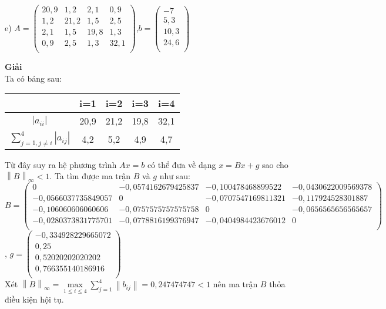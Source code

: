 e) $A= \begin{pmatrix}
20,9&1,2&2,1&0,9\\
1,2&21,2&1,5&2,5\\
2,1&1,5&19,8&1,3\\
0,9&2,5&1,3&32,1\\
\end{pmatrix}$,$b= \begin{pmatrix}
-7\\
5,3\\
10,3\\
24,6\\
\end{pmatrix}$
\par
\textbf{Giải}\\
Ta có bảng sau:\\
\begin{center}
\begin{tabular}{|c|c|c|c|c|}\hline
&i=1&i=2&i=3&i=4\\ \hline
$\left|a_{ii} \right|$&20,9&21,2&19,8&32,1\\ \hline
$\sum\limits_{j=1, j\neq i}^{4} \left|a_{ij}\right|$&4,2&5,2&4,9&4,7\\ \hline
\end{tabular}
\end{center}
Từ đây suy ra hệ phương trình $Ax=b$ có thể đưa về dạng $x=Bx+g$ sao cho $\left\|B\right\|_{\infty} <1$.
Ta tìm được ma trận $B$ và $g$ như sau:\\
$B=\begin{pmatrix}
0&-0,0574162679425837&-0,100478468899522&-0,0430622009569378\\
-0,0566037735849057&0&-0,0707547169811321&-0,117924528301887\\
-0,106060606060606&-0,0757575757575758&0&-0,0656565656565657\\
-0,0280373831775701&-0,0778816199376947&-0,0404984423676012&0\\
\end{pmatrix}$, $g=\begin{pmatrix}
-0,334928229665072\\
0,25\\
0,52020202020202\\
0,766355140186916\\
\end{pmatrix}$
\\
Xét $\left\|B \right\|_{\infty} =\underset{1\leq i \leq 4}\max \sum\limits_{j=1}^{4}{\left\|b_{ij}\right\|}=0,247474747<1$ nên ma trận $B$ thỏa điều kiện hội tụ.\\
